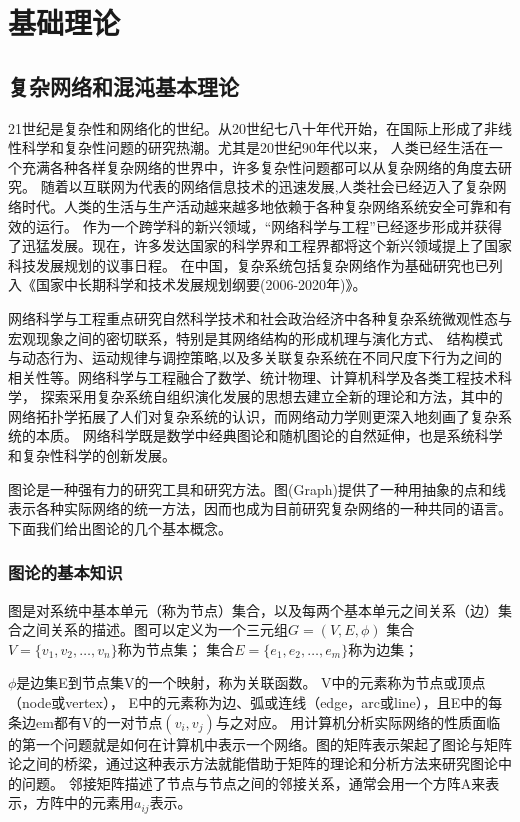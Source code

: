 \chapter{基础理论}
\section{复杂网络和混沌基本理论}
21世纪是复杂性和网络化的世纪。从20世纪七八十年代开始，在国际上形成了非线性科学和复杂性问题的研究热潮。尤其是20世纪90年代以来，
人类已经生活在一个充满各种各样复杂网络的世界中，许多复杂性问题都可以从复杂网络的角度去研究。
随着以互联网为代表的网络信息技术的迅速发展,人类社会已经迈入了复杂网络时代。人类的生活与生产活动越来越多地依赖于各种复杂网络系统安全可靠和有效的运行。
作为一个跨学科的新兴领域，“网络科学与工程”已经逐步形成并获得了迅猛发展。现在，许多发达国家的科学界和工程界都将这个新兴领域提上了国家科技发展规划的议事日程。
在中国，复杂系统包括复杂网络作为基础研究也已列入《国家中长期科学和技术发展规划纲要(2006-2020年)》。\par
网络科学与工程重点研究自然科学技术和社会政治经济中各种复杂系统微观性态与宏观现象之间的密切联系，特别是其网络结构的形成机理与演化方式、
结构模式与动态行为、运动规律与调控策略,以及多关联复杂系统在不同尺度下行为之间的相关性等。网络科学与工程融合了数学、统计物理、计算机科学及各类工程技术科学，
探索采用复杂系统自组织演化发展的思想去建立全新的理论和方法，其中的网络拓扑学拓展了人们对复杂系统的认识，而网络动力学则更深入地刻画了复杂系统的本质。
网络科学既是数学中经典图论和随机图论的自然延伸，也是系统科学和复杂性科学的创新发展。\par

图论是一种强有力的研究工具和研究方法。图(Graph)提供了一种用抽象的点和线表示各种实际网络的统一方法，因而也成为目前研究复杂网络的一种共同的语言。
下面我们给出图论的几个基本概念。
\subsection{图论的基本知识}
图是对系统中基本单元（称为节点）集合，以及每两个基本单元之间关系（边）集合之间关系的描述。图可以定义为一个三元组$G=(V,E,\phi)$
集合$V=\{v_1,v_2,…,v_n\}$称为节点集；
集合$E=\{e_1,e_2,…,e_m\}$称为边集；

$\phi$是边集E到节点集V的一个映射，称为关联函数。
V中的元素称为节点或顶点（node或vertex）， E中的元素称为边、弧或连线（edge，arc或line），且E中的每条边em都有V的一对节点$(v_i,v_j)$与之对应。
用计算机分析实际网络的性质面临的第一个问题就是如何在计算机中表示一个网络。图的矩阵表示架起了图论与矩阵论之间的桥梁，通过这种表示方法就能借助于矩阵的理论和分析方法来研究图论中的问题。
邻接矩阵描述了节点与节点之间的邻接关系，通常会用一个方阵A来表示，方阵中的元素用$a_{ij}$表示。          

